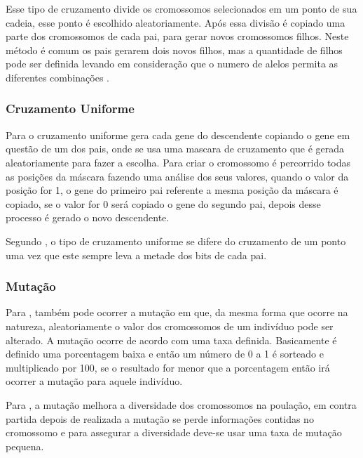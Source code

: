 \par Esse tipo de cruzamento divide os cromossomos selecionados em um ponto de
sua cadeia, esse ponto é escolhido aleatoriamente. Após essa divisão é copiado
uma parte dos cromossomos de cada pai, para gerar novos cromossomos filhos. Neste
método é comum os pais gerarem dois novos filhos, mas a quantidade de filhos
pode ser definida levando em consideração que o numero de alelos permita as
diferentes combinações \cite{REVISTA_MULTIDISCIPLINAR_DA_UNIESP}.

\subsubsection{Cruzamento Uniforme}

\par Para  o cruzamento
uniforme gera cada gene do descendente copiando o gene em questão de um dos
pais, onde se usa uma mascara de cruzamento que é gerada aleatoriamente para fazer a escolha. Para criar o cromossomo é percorrido todas as posições da máscara
fazendo uma análise dos seus valores, quando o valor da posição for 1, o gene do
primeiro pai referente a mesma posição da máscara é copiado, se o valor for 0
será copiado o gene do segundo pai, depois desse processo é gerado o novo
descendente.

\par Segundo , o tipo de cruzamento
uniforme se difere do cruzamento de um ponto uma vez que este sempre leva a
metade dos bits de cada pai.

\subsubsection{Mutação}

\par Para , também pode ocorrer a mutação em
que, da mesma forma que ocorre na natureza, aleatoriamente o valor dos
cromossomos de um indivíduo pode ser alterado. A mutação ocorre de acordo com
uma taxa definida. Basicamente é definido uma porcentagem baixa e então um
número de 0 a 1 é sorteado e multiplicado por 100, se o resultado for menor que
a porcentagem então irá ocorrer a mutação para aquele indivíduo.

\par Para , a mutação melhora a
diversidade dos cromossomos na poulação, em contra partida depois de realizada a
mutação se perde informações contidas no cromossomo e para assegurar a
diversidade deve-se usar uma taxa de mutação pequena. 

